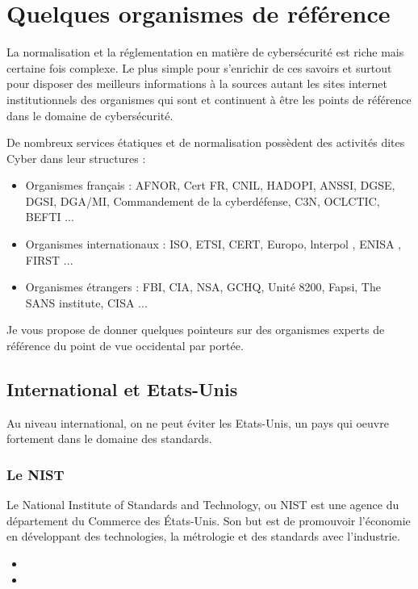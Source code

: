 \section{Quelques organismes de référence}

La normalisation et la réglementation en matière de cybersécurité est riche mais certaine fois complexe.
Le plus simple pour s'enrichir de ces savoirs et surtout pour disposer des meilleurs informations à la sources autant  les sites internet institutionnels des organismes qui sont et continuent à être les points de  référence dans le domaine de cybersécurité.

De nombreux services étatiques et de normalisation possèdent des activités dites Cyber dans leur structures :

\begin{itemize}
    \item  Organismes français : AFNOR, Cert FR, CNIL, HADOPI, ANSSI, DGSE, DGSI, DGA/MI, Commandement de la cyberdéfense, C3N, OCLCTIC, BEFTI ...
  \item  Organismes internationaux : ISO, ETSI, CERT, Europo, lnterpol , ENISA , FIRST ...
  \item  Organismes étrangers : FBI, CIA, NSA, GCHQ, Unité 8200, Fapsi, The SANS institute, CISA ...
\end{itemize}

Je vous propose de donner quelques pointeurs sur des organismes experts  de référence du point de vue occidental par portée.

\subsection{International et Etats-Unis}

Au niveau international, on ne peut éviter les Etats-Unis, un pays qui oeuvre fortement dans le domaine des standards.

\subsubsection{Le NIST}
Le National Institute of Standards and Technology, ou NIST est une agence du département du Commerce des États-Unis. Son but est de promouvoir l'économie en développant des technologies, la métrologie et des standards avec l'industrie. 

\begin{itemize}
  \item {}
  \item {}
\end{itemize}

